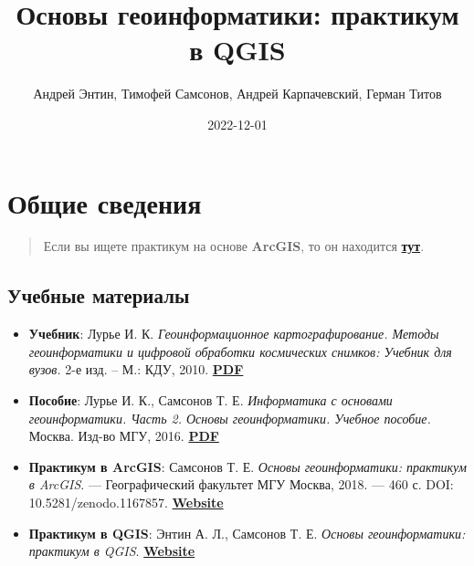 \documentclass[
  12pt,
]{book}
\title{Основы геоинформатики: практикум в QGIS}
\author{Андрей Энтин, Тимофей Самсонов, Андрей Карпачевский, Герман Титов}
\date{2022-12-01}
\begin{document}
\maketitle

{
\hypersetup{linkcolor=}
\setcounter{tocdepth}{1}
\tableofcontents
}
\hypertarget{ux43eux431ux449ux438ux435-ux441ux432ux435ux434ux435ux43dux438ux44f}{%
\chapter*{Общие сведения}\label{ux43eux431ux449ux438ux435-ux441ux432ux435ux434ux435ux43dux438ux44f}}

\begin{quote}
Если вы ищете практикум на основе \textbf{ArcGIS}, то он находится \href{https://tsamsonov.github.io/arcgis-course/}{\textbf{тут}}.
\end{quote}

\hypertarget{ux443ux447ux435ux431ux43dux44bux435-ux43cux430ux442ux435ux440ux438ux430ux43bux44b}{%
\section*{Учебные материалы}\label{ux443ux447ux435ux431ux43dux44bux435-ux43cux430ux442ux435ux440ux438ux430ux43bux44b}}

\begin{itemize}
\item
  \textbf{Учебник}: Лурье И. К. \emph{Геоинформационное картографирование. Методы геоинформатики и цифровой обработки космических снимков: Учебник для вузов.} 2-е изд. -- М.: КДУ, 2010. \href{https://istina.msu.ru/download/295728157/1jUpeD:roxrGk69x0LxZCpC5w_KNV0o390/}{\textbf{PDF}}
\item
  \textbf{Пособие}: Лурье И. К., Самсонов Т. Е. \emph{Информатика с основами геоинформатики. Часть 2. Основы геоинформатики. Учебное пособие.} Москва. Изд-во МГУ, 2016. \href{https://istina.msu.ru/download/45821659/1ej66u:uSUtcUS-XmdMMyRRpC-yflDmCv8/}{\textbf{PDF}}
\item
  \textbf{Практикум в ArcGIS}: Самсонов Т. Е. \emph{Основы геоинформатики: практикум в ArcGIS}. --- Географический факультет МГУ Москва, 2018. --- 460 с. DOI: 10.5281/zenodo.1167857. \href{https://tsamsonov.github.io/arcgis-course/}{\textbf{Website}}
\item
  \textbf{Практикум в QGIS}: Энтин А. Л., Самсонов Т. Е. \emph{Основы геоинформатики: практикум в QGIS}. \href{https://aentin.github.io/qgis-course/}{\textbf{Website}}
\end{itemize}
\end{document}
